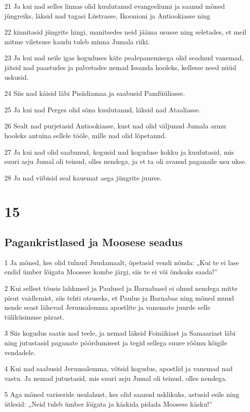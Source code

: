 \par 21 Ja kui nad selles linnas olid kuulutanud evangeeliumi ja saanud mõned jüngreiks, läksid nad tagasi Lüstrasse, Ikoonioni ja Antiookiasse ning
\par 22 kinnitasid jüngrite hingi, manitsedes neid jääma ususse ning seletades, et meil mitme viletsuse kaudu tuleb minna Jumala riiki.
\par 23 Ja kui nad neile igas koguduses käte pealepanemisega olid seadnud vanemad, jätsid nad paastudes ja palvetades nemad Issanda hooleks, kellesse need nüüd uskusid.
\par 24 Siis nad käisid läbi Pisiidiamaa ja saabusid Pamfüüliasse.
\par 25 Ja kui nad Perges olid sõna kuulutanud, läksid nad Ataaliasse.
\par 26 Sealt nad purjetasid Antiookiasse, kust nad olid väljunud Jumala armu hooleks antuina sellele tööle, mille nad olid lõpetanud.
\par 27 Ja kui nad olid saabunud, kogusid nad koguduse kokku ja kuulutasid, mis suuri asju Jumal oli teinud, olles nendega, ja et ta oli avanud paganaile usu ukse.
\par 28 Ja nad viibisid seal kauemat aega jüngrite juures.


\chapter{15}

\section*{Pagankristlased ja Moosese seadus}

\par 1 Ja mõned, kes olid tulnud Juudamaalt, õpetasid vendi nõnda: „Kui te ei lase endid ümber lõigata Moosese kombe järgi, siis te ei või õndsaks saada!”
\par 2 Kui sellest tõusis lahkmeel ja Paulusel ja Barnabasel ei olnud nendega mitte pisut vaidlemist, siis tehti otsuseks, et Paulus ja Barnabas ning mõned muud nende seast lähevad Jeruusalemma apostlite ja vanemate juurde selle tüliküsimuse pärast.
\par 3 Siis kogudus saatis nad teele, ja nemad läksid Foiniikiast ja Samaariast läbi ning jutustasid paganate pöördumisest ja tegid sellega suure rõõmu kõigile vendadele.
\par 4 Kui nad saabusid Jeruusalemma, võtsid kogudus, apostlid ja vanemad nad vastu. Ja nemad jutustasid, mis suuri asju Jumal oli teinud, olles nendega.
\par 5 Aga mõned variseride usulahust, kes olid saanud usklikuks, astusid esile ning ütlesid: „Neid tuleb ümber lõigata ja käskida pidada Moosese käsku!”


